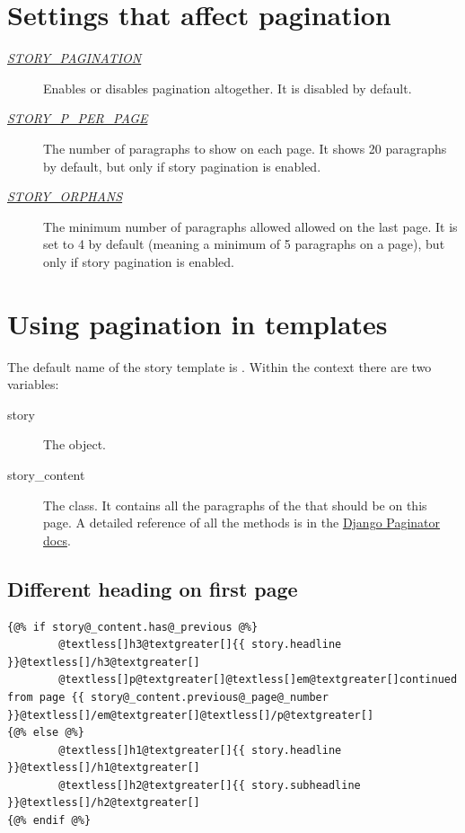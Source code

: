 \documentclass[letterpaper,10pt,english]{manual}
\begin{document}
\section{Settings that affect pagination}
\begin{description}
\item[\hyperlink{story-pagination}{\emph{STORY\_PAGINATION}}] \leavevmode
Enables or disables pagination altogether. It is disabled by default.

\item[\hyperlink{story-p-per-page}{\emph{STORY\_P\_PER\_PAGE}}] \leavevmode
The number of paragraphs to show on each page. It shows 20 paragraphs by default, but only if story pagination is enabled.

\item[\hyperlink{story-orphans}{\emph{STORY\_ORPHANS}}] \leavevmode
The minimum number of paragraphs allowed allowed on the last page. It is set to 4 by default (meaning a minimum of 5 paragraphs on a page), but only if story pagination is enabled.

\end{description}


\section{Using pagination in templates}

The default name of the story template is . Within the context there are two variables:
\begin{description}
\item[story] \leavevmode
The  object.

\item[story\_content] \leavevmode
The  class. It contains all the paragraphs of the  that should be on this page. A detailed reference of all the methods is in the \href{http://docs.djangoproject.com/en/dev/topics/pagination/\#paginator-objects}{Django Paginator docs}.

\end{description}


\subsection{Different heading on first page}

\begin{Verbatim}[commandchars=@\[\]]
{@% if story@_content.has@_previous @%}
        @textless[]h3@textgreater[]{{ story.headline }}@textless[]/h3@textgreater[]
        @textless[]p@textgreater[]@textless[]em@textgreater[]continued from page {{ story@_content.previous@_page@_number }}@textless[]/em@textgreater[]@textless[]/p@textgreater[]
{@% else @%}
        @textless[]h1@textgreater[]{{ story.headline }}@textless[]/h1@textgreater[]
        @textless[]h2@textgreater[]{{ story.subheadline }}@textless[]/h2@textgreater[]
{@% endif @%}
\end{Verbatim}
\end{document}
